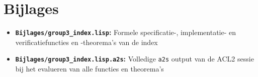 \section{Bijlages}
\begin{itemize}
\item \textbf{\texttt{Bijlages/group3\_index.lisp}:} Formele specificatie-, implementatie- en verificatiefuncties en -theorema's van de index
\item \textbf{\texttt{Bijlages/group3\_index.lisp.a2s}:} Volledige \texttt{a2s} output van de ACL2 sessie bij het evalueren van alle functies en theorema's
\end{itemize}